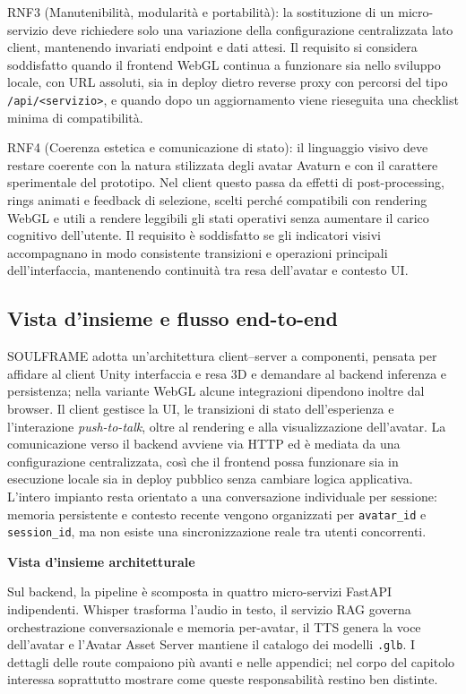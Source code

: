 RNF3 (Manutenibilità, modularità e portabilità): la sostituzione di un micro-servizio deve richiedere solo una variazione della configurazione centralizzata lato client, mantenendo invariati endpoint e dati attesi. Il requisito si considera soddisfatto quando il frontend WebGL continua a funzionare sia nello sviluppo locale, con URL assoluti, sia in deploy dietro reverse proxy con percorsi del tipo \texttt{/api/<servizio>}, e quando dopo un aggiornamento viene rieseguita una checklist minima di compatibilità.

RNF4 (Coerenza estetica e comunicazione di stato): il linguaggio visivo deve restare coerente con la natura stilizzata degli avatar Avaturn e con il carattere sperimentale del prototipo. Nel client questo passa da effetti di post-processing, rings animati e feedback di selezione, scelti perché compatibili con rendering WebGL e utili a rendere leggibili gli stati operativi senza aumentare il carico cognitivo dell'utente. Il requisito è soddisfatto se gli indicatori visivi accompagnano in modo consistente transizioni e operazioni principali dell'interfaccia, mantenendo continuità tra resa dell'avatar e contesto UI.

\subsection{Vista d'insieme e flusso end-to-end}
\label{sec:architettura-riferimento}
SOULFRAME adotta un'architettura client--server a componenti, pensata per affidare al client Unity interfaccia e resa 3D e demandare al backend inferenza e persistenza; nella variante WebGL alcune integrazioni dipendono inoltre dal browser. Il client gestisce la UI, le transizioni di stato dell'esperienza e l'interazione \textit{push-to-talk}, oltre al rendering e alla visualizzazione dell'avatar. La comunicazione verso il backend avviene via HTTP ed è mediata da una configurazione centralizzata, così che il frontend possa funzionare sia in esecuzione locale sia in deploy pubblico senza cambiare logica applicativa. L'intero impianto resta orientato a una conversazione individuale per sessione: memoria persistente e contesto recente vengono organizzati per \texttt{avatar\_id} e \texttt{session\_id}, ma non esiste una sincronizzazione reale tra utenti concorrenti.

\medskip
\noindent\textbf{Vista d'insieme architetturale}
\par
Sul backend, la pipeline è scomposta in quattro micro-servizi FastAPI indipendenti. Whisper trasforma l'audio in testo, il servizio RAG governa orchestrazione conversazionale e memoria per-avatar, il TTS genera la voce dell'avatar e l'Avatar Asset Server mantiene il catalogo dei modelli \texttt{.glb}. I dettagli delle route compaiono più avanti e nelle appendici; nel corpo del capitolo interessa soprattutto mostrare come queste responsabilità restino ben distinte.

